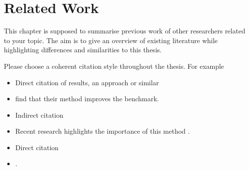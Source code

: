 \chapter{Related Work}
\label{ch:RW}

This chapter is supposed to summarise previous work of other researchers related to your topic.
The aim is to give an overview of existing literature while highlighting differences and similarities to this thesis.

Please choose a coherent citation style throughout the thesis. For example

\begin{itemize}
	\item Direct citation of results, an approach or similar
	\item[] \Textcite{Fan.2015} find that their method improves the benchmark.
	\item Indirect citation
	\item[] Recent research highlights the importance of this method \Parencite{Fan.2015}.
	\item Direct citation
	\item[]  \Parencite{Fan.2015}.
\end{itemize}




